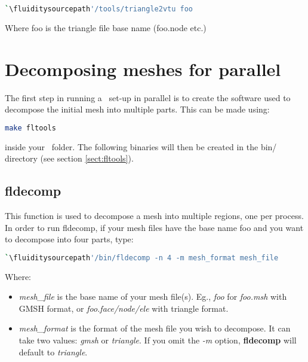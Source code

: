 \begin{lstlisting}[language = Bash]
`\fluiditysourcepath'/tools/triangle2vtu foo
\end{lstlisting}

Where foo is the triangle file base name (\ie foo.node etc.)

\section{Decomposing meshes for parallel}
\label{decomp_meshes_parallel}

The first step in running a \fluidity\ set-up in parallel is to create the software
used to decompose the initial mesh into multiple parts. This can be made using:
\begin{lstlisting}[language=bash]
make fltools
\end{lstlisting}
inside your \fluidity\ folder. The following binaries will then be created in the bin/ directory (see section \ref{sect:fltools}).



\subsection{fldecomp}
\label{mesh!meshing tools!fldecomp}
This function is used to decompose a mesh into multiple regions, one per process. In order to run fldecomp, if your mesh files have the base name foo and you want to decompose into four parts, type:
\begin{lstlisting}[language = Bash]
`\fluiditysourcepath'/bin/fldecomp -n 4 -m mesh_format mesh_file
\end{lstlisting}

Where:
\begin{itemize}
\item \textit{mesh\_file} is the base name of your mesh file(s). Eg., \textit{foo} for \textit{foo.msh} with GMSH format, or \textit{foo.face/node/ele} with triangle format.

\item \textit{mesh\_format} is the format of the mesh file you wish to decompose. It can
take two values: \textit{gmsh} or \textit{triangle}. If you omit the \textit{-m} option, \textbf{fldecomp} will default to \textit{triangle}.
\end{itemize}

